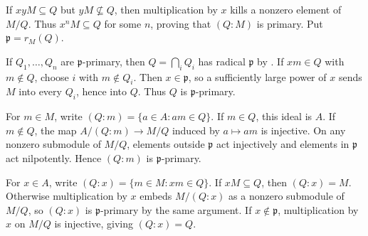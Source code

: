 If $xyM\subseteq Q$ but $yM\not\subseteq Q$, then multiplication by $x$ kills a nonzero element of $M/Q$. Thus $x^nM\subseteq Q$ for some $n$, proving that $(Q:M)$ is primary. Put $\mathfrak{p}=r_M(Q)$.

If $Q_1,\ldots,Q_n$ are $\mathfrak{p}$-primary, then $Q=\bigcap_iQ_i$ has radical $\mathfrak{p}$ by . If $xm\in Q$ with $m\notin Q$, choose $i$ with $m\notin Q_i$. Then $x\in\mathfrak{p}$, so a sufficiently large power of $x$ sends $M$ into every $Q_i$, hence into $Q$. Thus $Q$ is $\mathfrak{p}$-primary.

For $m\in M$, write $(Q:m)=\{a\in A:am\in Q\}$. If $m\in Q$, this ideal is $A$. If $m\notin Q$, the map $A/(Q:m)\to M/Q$ induced by $a\mapsto am$ is injective. On any nonzero submodule of $M/Q$, elements outside $\mathfrak{p}$ act injectively and elements in $\mathfrak{p}$ act nilpotently. Hence $(Q:m)$ is $\mathfrak{p}$-primary.

For $x\in A$, write $(Q:x)=\{m\in M:xm\in Q\}$. If $xM\subseteq Q$, then $(Q:x)=M$. Otherwise multiplication by $x$ embeds $M/(Q:x)$ as a nonzero submodule of $M/Q$, so $(Q:x)$ is $\mathfrak{p}$-primary by the same argument. If $x\notin\mathfrak{p}$, multiplication by $x$ on $M/Q$ is injective, giving $(Q:x)=Q$.
